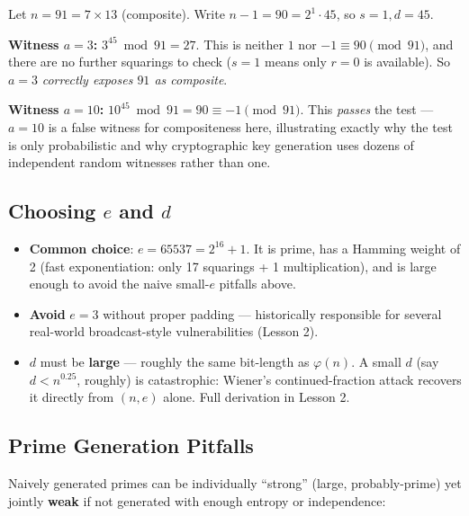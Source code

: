 \begin{example}
Let $n = 91 = 7 \times 13$ (composite). Write $n - 1 = 90 = 2^1 \cdot 45$, so $s=1, d=45$.

\textbf{Witness $a=3$:} $3^{45} \bmod 91 = 27$. This is neither $1$ nor $-1 \equiv 90 \pmod{91}$, and there are no further squarings to check ($s=1$ means only $r=0$ is available). So $a=3$ \emph{correctly exposes $91$ as composite}.

\textbf{Witness $a=10$:} $10^{45} \bmod 91 = 90 \equiv -1 \pmod{91}$. This \emph{passes} the test — $a=10$ is a false witness for compositeness here, illustrating exactly why the test is only probabilistic and why cryptographic key generation uses dozens of independent random witnesses rather than one.
\end{example}

\subsection{Choosing $e$ and $d$}\label{sec:practical-e}

\begin{itemize}
\item \textbf{Common choice}: $e = 65537 = 2^{16}+1$. It is prime, has a Hamming weight of 2 (fast exponentiation: only 17 squarings + 1 multiplication), and is large enough to avoid the naive small-$e$ pitfalls above.
\item \textbf{Avoid} $e=3$ without proper padding — historically responsible for several real-world broadcast-style vulnerabilities (Lesson 2).
\item $d$ must be \textbf{large} — roughly the same bit-length as $\varphi(n)$. A small $d$ (say $d < n^{0.25}$, roughly) is catastrophic: Wiener's continued-fraction attack recovers it directly from $(n,e)$ alone. Full derivation in Lesson 2.
\end{itemize}

\subsection{Prime Generation Pitfalls}

Naively generated primes can be individually ``strong'' (large, probably-prime) yet jointly \textbf{weak} if not generated with enough entropy or independence:

